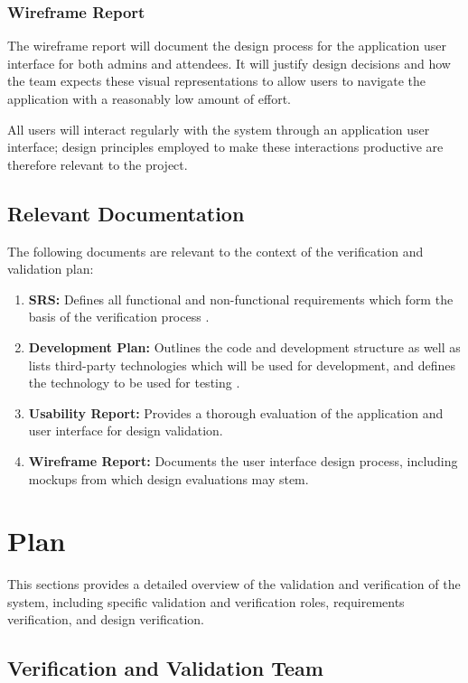\documentclass[12pt, titlepage]{article}
\begin{document}
\subsubsection{Wireframe Report}
The wireframe report will document the design process for the application user interface for both admins and attendees.
It will justify design decisions and how the team expects these visual representations to allow users to navigate the
application with a reasonably low amount of effort.

All users will interact regularly with the system through an application user interface; design principles employed to
make these interactions productive are therefore relevant to the project.

\subsection{Relevant Documentation}
The following documents are relevant to the context of the verification and validation plan:
\begin{enumerate}[align=left,
  leftmargin=*,
  labelsep=1em,
  itemindent=0em, font=\bfseries]
  \item {\bfseries SRS:} Defines all functional and non-functional requirements which form the basis of the verification
    process \citep{SRS}.
  \item {\bfseries Development Plan:} Outlines the code and development structure as well as lists third-party
    technologies which will be used for development, and defines the technology to be used for testing \citep{DVP}.
  \item {\bfseries Usability Report:} Provides a thorough evaluation of the application and user interface for design
    validation.
  \item {\bfseries Wireframe Report:} Documents the user interface design process, including mockups from which design
    evaluations may stem.
\end{enumerate}

\section{Plan}

This sections provides a detailed overview of the validation and verification of the system, including specific validation and verification roles, requirements verification, and design verification.

\subsection{Verification and Validation Team}
\end{document}
